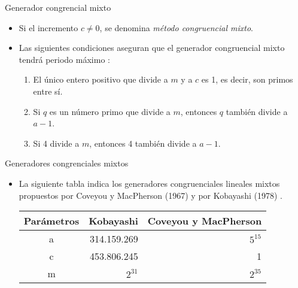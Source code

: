 \begin{frame}{Generador congrencial mixto}
    \begin{itemize}
        \item Si el incremento $c\neq 0$, se denomina \textit{método congruencial mixto}. 
        \item Las siguientes condiciones aseguran que el generador congruencial mixto tendrá periodo máximo \cite{PSD, LK}:
        \begin{enumerate}
            \item El único entero positivo que divide a $m$ y a $c$ es 1, es decir, son primos entre sí.
            \item Si $q$ es un número primo que divide a $m$, entonces $q$ también divide a $a-1$.
            \item Si 4 divide a $m$, entonces 4 también divide a $a-1$.
        \end{enumerate}
    \end{itemize}
\end{frame}

\begin{frame}{Generadores congrenciales mixtos}
    \begin{itemize}
    \item La siguiente tabla indica los generadores congruenciales lineales mixtos propuestos por Coveyou y MacPherson (1967) y por Kobayashi (1978) \cite{PSD}.
    \begin{table}[]
    \begin{tabular}{|c|r|r|}
    \hline
    \rowcolor[HTML]{794033} 
    {\color[HTML]{FFFFFF} \textbf{Parámetros}} & {\color[HTML]{FFFFFF} \textbf{Kobayashi}} & {\color[HTML]{FFFFFF} \textbf{Coveyou y MacPherson}} \\ \hline
    \rowcolor[HTML]{F28165} 
    a & 314.159.269 & $5^{15}$ \\ \hline
    \rowcolor[HTML]{F28165} 
    c & 453.806.245 & 1 \\ \hline
    \rowcolor[HTML]{F28165} 
    m & $2^{31}$ & $2^{35}$ \\ \hline
    \end{tabular}
    \end{table}
    \end{itemize}
\end{frame}


